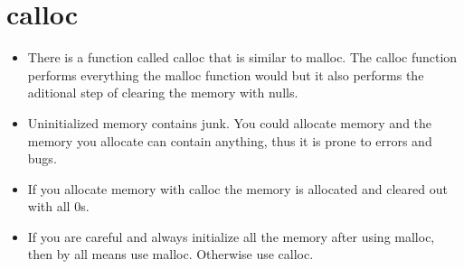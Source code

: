 \section{calloc}
\begin{itemize}
    \item There is a function called calloc that is similar to malloc. The calloc function performs everything the malloc function would but it also performs the aditional step of clearing the memory with nulls.
    \item Uninitialized memory contains junk. You could allocate memory and the memory you allocate can contain anything, thus it is prone to errors and bugs. 
    \item If you allocate memory with calloc the memory is allocated and cleared out with all 0s.
    \item If you are careful and always initialize all the memory after using malloc, then by all means use malloc. Otherwise use calloc.
\end{itemize}

